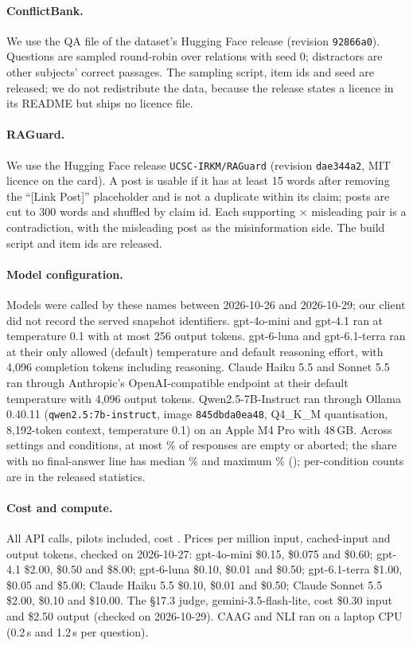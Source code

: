 \paragraph{ConflictBank.} We use the QA file of the dataset's Hugging Face release (revision \texttt{92866a0}). Questions are sampled round-robin over relations with seed 0; distractors are other subjects' correct passages. The
sampling script, item ids and seed are released; we do not redistribute the data, because the release states
a licence in its README but ships no licence file.

\paragraph{RAGuard.} We use the Hugging Face release \texttt{UCSC-IRKM/RAGuard} (revision \texttt{dae344a2}, MIT
licence on the card). A post is usable if it has at least 15 words after removing the ``[Link Post]'' placeholder and is
not a duplicate within its claim; posts are cut to 300 words and shuffled by claim id. Each supporting $\times$ misleading
pair is a contradiction, with the misleading post as the misinformation side. The build script and item ids are
released.

\paragraph{Model configuration.} Models were called by these names between 2026-10-26 and 2026-10-29;
our client did not record the served snapshot identifiers. gpt-4o-mini and gpt-4.1 ran at temperature 0.1
with at most 256 output tokens. gpt-6-luna and gpt-6.1-terra ran at their only allowed (default) temperature and default
reasoning effort, with 4,096 completion tokens including reasoning. Claude Haiku 5.5 and Sonnet 5.5 ran through
Anthropic's OpenAI-compatible endpoint at their default temperature with 4,096 output tokens. Qwen2.5-7B-Instruct ran
through Ollama 0.40.11 (\texttt{qwen2.5:7b-instruct}, image \texttt{845dbda0ea48}, Q4\_K\_M quantisation, 8,192-token
context, temperature 0.1) on an Apple M4 Pro with 48\,GB. Across settings and conditions, at most \truncMaxEmpty\% of
responses are empty or aborted; the share with no final-answer line has median \truncMedNoFinal\% and maximum
\truncMaxNoFinal\% (\truncMaxAt); per-condition counts are in the released statistics.

\paragraph{Cost and compute.} All API calls, pilots included, cost \totalSpend. Prices per million input, cached-input and output tokens, checked on 2026-10-27: gpt-4o-mini \$0.15, \$0.075 and \$0.60; gpt-4.1 \$2.00, \$0.50 and \$8.00; gpt-6-luna \$0.10, \$0.01 and \$0.50; gpt-6.1-terra \$1.00, \$0.05 and \$5.00; Claude Haiku 5.5 \$0.10, \$0.01 and
\$0.50; Claude Sonnet 5.5 \$2.00, \$0.10 and \$10.00. The \S17.3 judge, gemini-3.5-flash-lite, cost \$0.30 input and \$2.50 output (checked on 2026-10-29). CAAG and NLI ran on a
laptop CPU (0.2\,s and 1.2\,s per question).
